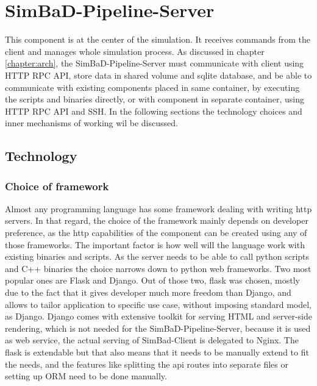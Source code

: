 \section{SimBaD-Pipeline-Server}
This component is at the center of the simulation. It receives commands from the client and manages whole simulation process.
As discussed in chapter \ref{chapter:arch}, the SimBaD-Pipeline-Server must communicate with client using HTTP RPC API, store data in shared volume and sqlite database, and be able to communicate with existing components placed in same container, by executing the scripts and binaries directly, or with component in separate container, using HTTP RPC API and SSH. In the following sections the technology choices and inner mechanisms of working wil be discussed.
\subsection{Technology}
\subsubsection{Choice of framework}
Almost any programming language has some framework dealing with writing http servers. In that regard, the choice of the framework mainly depends on developer preference, as the http capabilities of the component can be created using any of those frameworks. The important factor is how well will the language work with existing binaries and scripts. As the server needs to be able to call python scripts and C++ binaries the choice narrows down to python web frameworks. Two most popular ones are Flask and Django. Out of those two, flask was chosen, mostly due to the fact that it gives developer much more freedom than Django, and allows to tailor application to specific use case, without imposing standard model, as Django. Django comes with extensive toolkit for serving HTML and server-side rendering, which is not needed for the SimBaD-Pipeline-Server, because it is used as web service, the actual serving of SimBad-Client is delegated to Nginx.
The flask is extendable but that also means that it needs to be manually extend to fit the needs, and the features like splitting the api routes into separate files or setting up ORM need to be done manually.
